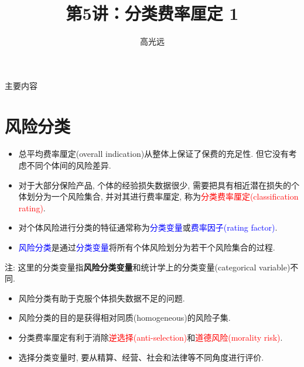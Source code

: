 \documentclass[professionalfont]{beamer}
\title{第5讲：分类费率厘定 1}
\author{高光远}
\institute{中国人民大学~统计学院}
\date{}
\newcommand{\red}[1]{\textcolor{red}{#1}}
\newcommand{\blue}[1]{\textcolor{blue}{#1}}
\begin{document}
\begin{frame}
	\titlepage
\end{frame}

\begin{frame}{主要内容}
	\tableofcontents
\end{frame}



\section{风险分类}
\begin{frame}
\begin{itemize}
	\item 总平均费率厘定(overall indication)从整体上保证了保费的充足性. 但它没有考虑不同个体间的风险差异. 
	\item 对于大部分保险产品, 个体的经验损失数据很少, 需要把具有相近潜在损失的个体划分为一个风险集合, 并对其进行费率厘定, 称为\red{分类费率厘定(classification rating)}.
	\item 对个体风险进行分类的特征通常称为\blue{分类变量}或\blue{费率因子(rating factor)}.
	\item \blue{风险分类}是通过\blue{分类变量}将所有个体风险划分为若干个风险集合的过程.
\end{itemize}
注: 这里的分类变量指\textbf{风险分类变量}和统计学上的分类变量(categorical variable)不同.

\end{frame}
\begin{frame}
	\begin{itemize}
		\item 风险分类有助于克服个体损失数据不足的问题. 
		\item 风险分类的目的是获得相对同质(homogeneous)的风险子集.
		\item 分类费率厘定有利于消除\red{逆选择(anti-selection)}和\red{道德风险(morality risk)}.
		\item 选择分类变量时, 要从精算、经营、社会和法律等不同角度进行评价.
	\end{itemize}
\end{frame}
\end{document}
